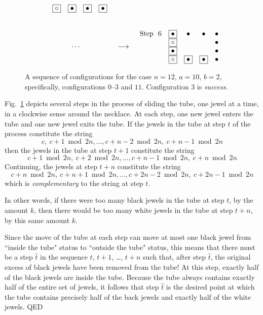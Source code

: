 \documentclass{article}
\begin{document}
\begin{figure}[htb]
\[\begin{array}{ccc}
\begin{array}{rcccc}
& \fbox{$\circ$} &  \fbox{$\bullet$} & \fbox{$\bullet$} & \fbox{$\bullet$}
\end{array}
 \\  \\  \\
\cdots & \longrightarrow &
\begin{array}{rcccc}
\mbox{Step } \ 6 &
 \fbox{$\bullet$} & \bullet & \bullet & \bullet  \\
& \fbox{$\circ$}   &                      &                      & \bullet  \\
&  \fbox{$\bullet$} &                      &                      & \bullet  \\
& \fbox{$\circ$}    &   \fbox{$\bullet$}          &    \fbox{$\bullet$}   & \bullet \\
\end{array}
\end{array}
\]
\caption{A sequence of configurations for the case $n=12$, $a = 10$, $b=2$, specifically, configurations $0$--$3$ and $11$.  Configuration $3$ is {\em success}.}
\label{fig:necklace}
\end{figure}

Fig.~\ref{fig:necklace} depicts several steps in the process of sliding the tube, one jewel at a time, in a clockwise sense around the necklace.  At each step, one new jewel enters the tube and one new jewel exits the tube.  If the jewels in the tube at step $t$ of the process constitute the string
\[ c, \ c+1 \bmod 2n, \ldots,  c+n-2 \bmod 2n, \ c+n-1 \bmod 2n \]
then the jewels in the tube at step $t+1$ constitute the string
\[ c+1 \bmod 2n,  \ c+2 \bmod 2n, \ldots,  c+n-1 \bmod 2n , \ c+n \bmod 2n \]
Continuing, the jewels at step $t + n$ constitute the string
\[ c+n \bmod 2n, \ c+n+1 \bmod 2n,   \ldots,  c+ 2n-2 \bmod 2n , \ c+2n-1 \bmod 2n \]
which is {\em complementary} to the string at step $t$.

\smallskip

In other words, if there were too many black jewels in the tube at step $t$, by the amount $k$, then there would be too many white jewels in the tube at step $t+n$, by this same amount $k$.

\smallskip

Since the move of the tube at each step can move at most one black jewel from ``inside the tube" status to ``outside the tube" status, this means that there must be a step $\hat{t}$ in the sequence $t$, $t+1$, \ldots, $t+n$ such that, after step $\hat{t}$, the original excess of black jewels have been removed from the tube!  At this step, exactly half of the black jewels are inside the tube.  Because the tube always contains exactly half of the entire set of jewels, it follows that step $\hat{t}$ is the desired point at which the tube contains precisely half of the back jewels and exactly half of the white jewels.  QED
\end{document}
